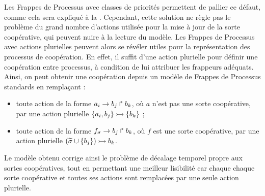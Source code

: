 \label{ph2phm}
Les Frappes de Processus avec classes de priorités permettent de pallier ce défaut,
comme cela sera expliqué à la .
Cependant, cette solution ne règle pas le problème du grand nombre d'actions
utilisée pour la mise à jour de la sorte coopérative,
qui peuvent nuire à la lecture du modèle.
Les Frappes de Processus avec actions plurielles peuvent alors se révéler utiles
pour la représentation des processus de coopération.
En effet, il suffit d'une action plurielle pour définir une coopération entre processus,
à condition de lui attribuer les frappeurs adéquats.
Ainsi, on peut obtenir une coopération depuis un modèle de Frappes de Processus standards
en remplaçant :
\begin{itemize}
  \item toute action de la forme $a_i\rightarrow b_j\Rsh b_k$,
    où $a$ n'est pas une sorte coopérative, par
    une action plurielle $\mbox{$\{a_i, b_j\} \rightarrowtail \{b_k\}$}$ ;
  \item toute action de la forme $f_{\sigma}\rightarrow b_j\Rsh b_k$,
    où $f$ est une sorte coopérative, par
    une action plurielle $\mbox{$(\widetilde{\sigma} \cup \{ b_j \}) \rightarrowtail b_k$}$.
\end{itemize}
Le modèle obtenu corrige ainsi le problème de décalage temporel propre aux sortes
coopératives, tout en permettant une meilleur lisibilité
car chaque chaque sorte coopérative et toutes ses actions sont remplacées par
une seule action plurielle.

